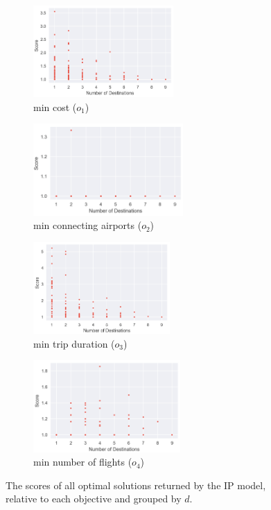 \documentclass{mpaper}
\begin{document}
\begin{figure}[!ht]
    \centering
    \begin{subfigure}[b]{0.24\textwidth}
        \includegraphics[width=\textwidth, height=3.5cm]{cost_ip.png}
        \caption{min cost ($o_1$)}
        \label{costip}
    \end{subfigure}
    \begin{subfigure}[b]{0.24\textwidth}
        \includegraphics[width=\textwidth, height=3.5cm]{connair_ip.png}
        \caption{min connecting airports ($o_2$)}
        \label{airportsip}
    \end{subfigure}
    \begin{subfigure}[b]{0.24\textwidth}
        \includegraphics[width=\textwidth, height=3.5cm]{trip_ip.png}
        \caption{min trip duration ($o_3$)}
        \label{tripip}
    \end{subfigure}
    \begin{subfigure}[b]{0.24\textwidth}
        \includegraphics[width=\textwidth, height=3.5cm]{flights_ip.png}
        \caption{min number of flights ($o_4$)}
        \label{flightsip}
    \end{subfigure}
    \caption{The scores of all optimal solutions returned by the IP model, relative to each objective and grouped by $d$.}
    \label{fig:ipmultiobj}
\end{figure}
\end{document}
